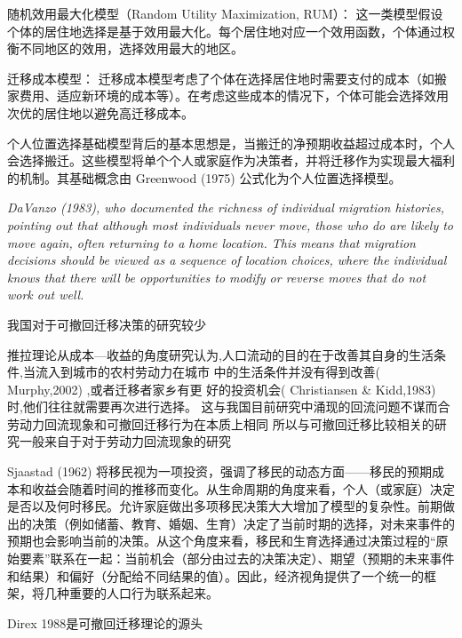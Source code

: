 \documentclass[a4paper,12pt]{article}
\begin{document}
随机效用最大化模型（Random Utility Maximization, RUM）： 这一类模型假设个体的居住地选择是基于效用最大化。每个居住地对应一个效用函数，个体通过权衡不同地区的效用，选择效用最大的地区。

迁移成本模型： 迁移成本模型考虑了个体在选择居住地时需要支付的成本（如搬家费用、适应新环境的成本等）。在考虑这些成本的情况下，个体可能会选择效用次优的居住地以避免高迁移成本。

个人位置选择基础模型背后的基本思想是，当搬迁的净预期收益超过成本时，个人会选择搬迁。这些模型将单个个人或家庭作为决策者，并将迁移作为实现最大福利的机制。其基础概念由 Greenwood (1975) 公式化为个人位置选择模型。








\textit{DaVanzo (1983), who documented the richness  of individual migration histories, pointing out that although most individuals never move,  those who do are likely to move again, often returning to a home location. This means  that migration decisions should be viewed as a sequence of location choices, where the  individual knows that there will be opportunities to modify or reverse moves that do not  work out well.}










我国对于可撤回迁移决策的研究较少

推拉理论从成本—收益的角度研究认为,人口流动的目的在于改善其自身的生活条件,当流入到城市的农村劳动力在城市  中的生活条件并没有得到改善( Murphy,2002) ,或者迁移者家乡有更  好的投资机会( Christiansen \& Kidd,1983) 时,他们往往就需要再次进行选择。
这与我国目前研究中涌现的回流问题不谋而合
劳动力回流现象和可撤回迁移行为在本质上相同
所以与可撤回迁移比较相关的研究一般来自于对于劳动力回流现象的研究

Sjaastad (1962) 将移民视为一项投资，强调了移民的动态方面——移民的预期成本和收益会随着时间的推移而变化。从生命周期的角度来看，个人（或家庭）决定是否以及何时移民。允许家庭做出多项移民决策大大增加了模型的复杂性。前期做出的决策（例如储蓄、教育、婚姻、生育）决定了当前时期的选择，对未来事件的预期也会影响当前的决策。从这个角度来看，移民和生育选择通过决策过程的“原始要素”联系在一起：当前机会（部分由过去的决策决定）、期望（预期的未来事件和结果）和偏好（分配给不同结果的值）。因此，经济视角提供了一个统一的框架，将几种重要的人口行为联系起来。

Direx 1988是可撤回迁移理论的源头
\end{document}
